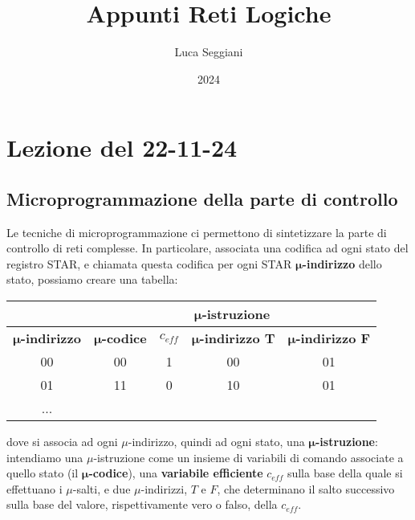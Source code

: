 \documentclass[a4paper,11pt]{article}
\title{Appunti Reti Logiche}
\author{Luca Seggiani}
\date{2024}
\begin{document}
\section{Lezione del 22-11-24}

\thispagestyle{empty}
\pagestyle{fancy}

\subsection{Microprogrammazione della parte di controllo}
Le tecniche di microprogrammazione ci permettono di sintetizzare la parte di controllo di reti complesse.
In particolare, associata una codifica ad ogni stato del registro STAR, e chiamata questa codifica per ogni STAR $\boldsymbol{\mu}$\textbf{-indirizzo} dello stato, possiamo creare una tabella:
\begin{table}[H]
	\center 
	\begin{tabular} { c | c  c  c  c }
		& \multicolumn{4}{c}{$\boldsymbol{\mu}$\bfseries -istruzione} \\ 
		\hline
		$\boldsymbol{\mu}$\bfseries-{indirizzo} & 
		$\boldsymbol{\mu}$\bfseries-{codice} & 
		$c_{eff}$ & 
		$\boldsymbol{\mu}$\bfseries-{indirizzo T} & 
		$\boldsymbol{\mu}$\bfseries-{indirizzo F} \\
		\hline 
		00 & 00 & 1 & 00 & 01 \\ 
		01 & 11 & 0 & 10 & 01 \\ 
		...
	\end{tabular}
\end{table}

dove si associa ad ogni $\mu$-indirizzo, quindi ad ogni stato, una $\boldsymbol{\mu}$\textbf{-istruzione}: intendiamo una $\mu$-istruzione come un insieme di variabili di comando associate a quello stato (il $\boldsymbol{\mu}$\textbf{-codice}), una \textbf{variabile efficiente} $c_{eff}$ sulla base della quale si effettuano i $\mu$-salti, e due $\mu$-indirizzi, $T$ e $F$, che determinano il salto successivo sulla base del valore, rispettivamente vero o falso, della $c_{eff}$.
\end{document}

